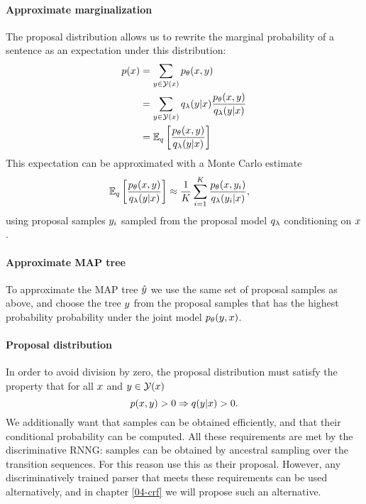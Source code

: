 \paragraph{Approximate marginalization}
The proposal distribution allows us to rewrite the marginal probability of a sentence as an expectation under this distribution:
\begin{align*}
  p (x)
    &= \sum_{y  \in \mathcal{Y}(x)} p_{\theta}(x, y) \\
    &= \sum_{y  \in \mathcal{Y}(x)} q_{\lambda}(y |x) \frac{p_{\theta}(x,y )}{q_{\lambda}(y | x)} \\
    &= \operatorname{\mathbb{E}}_{q} \bigg[\frac{p_{\theta}(x,y )}{q_{\lambda}(y | x)} \bigg] \\
  \label{eq:lowerbound}
\end{align*}
This expectation can be approximated with a Monte Carlo estimate
\begin{align}
  \operatorname{\mathbb{E}}_{q} \bigg[\frac{p_{\theta}(x,y )}{q_{\lambda}(y | x)} \bigg]
    &\approx \frac{1}{K}\sum_{i=1}^K  \frac{p_{\theta}( x, y_i )}{q_{\lambda}(y_i | x)},
\end{align}
using proposal samples $y_i$ sampled from the proposal model $q_{\lambda}$ conditioning on $x$.

\paragraph{Approximate MAP tree}
To approximate the MAP tree $\hat{y}$ we use the same set of proposal samples as above, and choose the tree $y$ from the proposal samples that has the highest probability probability under the joint model $p_{\theta}( y, x)$.

\paragraph{Proposal distribution}
In order to avoid division by zero, the proposal distribution must satisfy the property that for all $x$ and $y \in \mathcal{Y}(x)$
\begin{equation*}
  p(x, y) > 0 \Rightarrow q( y| x ) > 0.
\end{equation*}
We additionally want that samples can be obtained efficiently, and that their conditional probability can be computed. All these requirements are met by the discriminative RNNG: samples can be obtained by ancestral sampling over the transition sequences. For this reason \citet{dyer2016rnng} use this as their proposal. However, any discriminatively trained parser that meets these requirements can be used alternatively, and in chapter \ref{04-crf} we will propose such an alternative.

